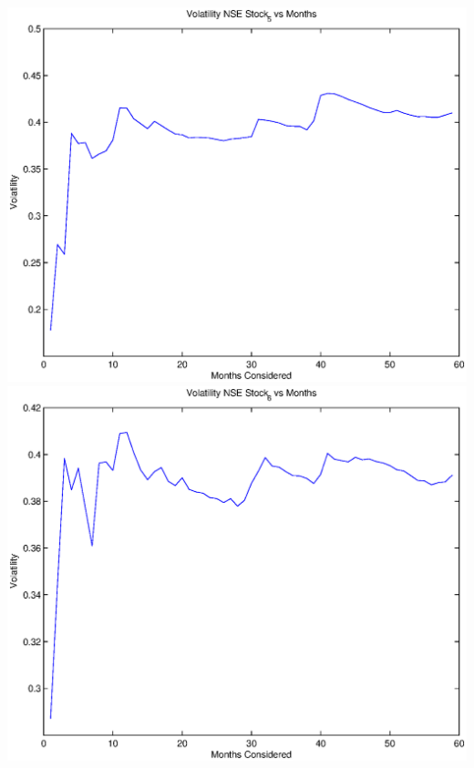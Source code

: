 \documentclass{article}
\begin{document}
\includegraphics[width=\textwidth]{Volatility_NSE_Stock_5_vs_Months} \\

\includegraphics[width=\textwidth]{Volatility_NSE_Stock_6_vs_Months} \\
\end{document}
